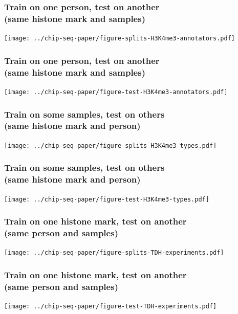 \documentclass{beamer}
\begin{document}
\begin{frame}
  \frametitle{Train on one person, test on another\\
(same histone mark and samples)}
  \texttt{[image: ../chip-seq-paper/figure-splits-H3K4me3-annotators.pdf]}
\end{frame}

\begin{frame}
  \frametitle{Train on one person, test on another\\
(same histone mark and samples)}
  \texttt{[image: ../chip-seq-paper/figure-test-H3K4me3-annotators.pdf]}
\end{frame}

\begin{frame}
  \frametitle{Train on some samples, test on others\\
(same histone mark and person)}
  \texttt{[image: ../chip-seq-paper/figure-splits-H3K4me3-types.pdf]}
\end{frame}

\begin{frame}
  \frametitle{Train on some samples, test on others\\
(same histone mark and person)}
  \texttt{[image: ../chip-seq-paper/figure-test-H3K4me3-types.pdf]}
\end{frame}

\begin{frame}
  \frametitle{Train on one histone mark, test on another\\
(same person and samples)}
  \texttt{[image: ../chip-seq-paper/figure-splits-TDH-experiments.pdf]}
\end{frame}

\begin{frame}
  \frametitle{Train on one histone mark, test on another\\
(same person and samples)}
  \texttt{[image: ../chip-seq-paper/figure-test-TDH-experiments.pdf]}
\end{frame}



\end{document}
